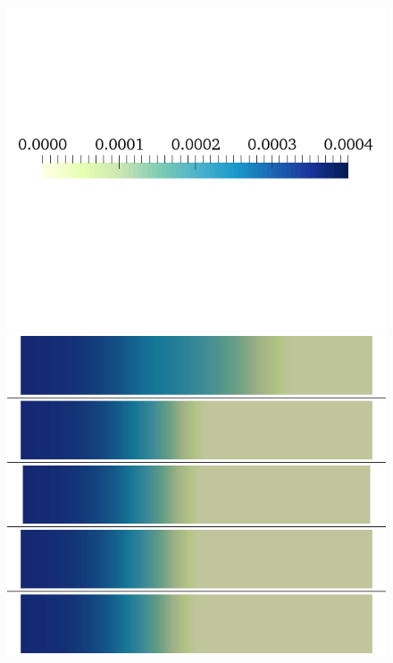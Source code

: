 \documentclass[12pt,a4paper]{article}
\begin{document}
%
\begin{figure}
\begin{minipage}{0.5\textwidth}
\includegraphics[trim=0cm 7cm 0cm 6cm, clip=true, width=1\linewidth]{legend_cai}
\includegraphics[trim=0cm 0cm 0cm 0cm, clip=true, width=1\linewidth]{cai_gk1}
    \end{minipage}
    \begin{minipage}{0.5\textwidth}

\end{minipage}
\end{figure}
\end{document}
